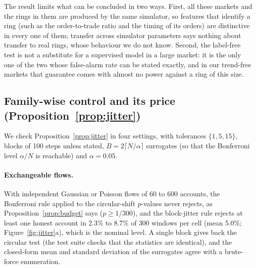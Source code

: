 \begin{table}[t]
\centering\footnotesize
{}
\caption{Share of ring-active windows in which a ring member is among the $B$ top-ranked accounts (mean over markets, 16 test episodes per market, default ring): the label-free test, a boosting model trained on the generic simulator and applied unchanged, and the same model trained on 24 labelled episodes of the test market}\label{tab:transfer}
\end{table}

The result limits what can be concluded in two ways. First, all these markets and the rings in them are produced by the same simulator, so features that identify a ring (such as the order-to-trade ratio and the timing of its orders) are distinctive in every one of them; transfer across simulator parameters says nothing about transfer to real rings, whose behaviour we do not know. Second, the label-free test is not a substitute for a supervised model in a large market: it is the only one of the two whose false-alarm rate can be stated exactly, and in our trend-free markets that guarantee comes with almost no power against a ring of this size.

\subsection{Family-wise control and its price (Proposition~\ref{prop:jitter})}\label{sec:jittercheck}

We check Proposition~\ref{prop:jitter} in four settings, with tolerances $\{1,5,15\}$, blocks of 100 steps unless stated, $B=2\lceil N/\alpha\rceil$ surrogates (so that the Bonferroni level $\alpha/N$ is reachable) and $\alpha=0.05$.

\paragraph{Exchangeable flows.} With independent Gaussian or Poisson flows of 60 to 600 accounts, the Bonferroni rule applied to the circular-shift $p$-values never rejects, as Proposition~\ref{prop:budget} says ($p\ge1/300$), and the block-jitter rule rejects at least one honest account in 2.3\% to 8.7\% of 300 windows per cell (mean 5.0\%; Figure~\ref{fig:jitter}a), which is the nominal level. A single block gives back the circular test (the test suite checks that the statistics are identical), and the closed-form mean and standard deviation of the surrogates agree with a brute-force enumeration.

